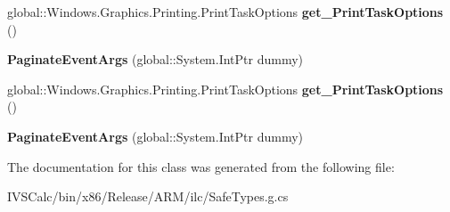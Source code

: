 \begin{DoxyCompactItemize}
global\+::\+Windows.\+Graphics.\+Printing.\+Print\+Task\+Options {\bfseries get\+\_\+\+Print\+Task\+Options} ()
\item 
\mbox{\label{class_windows_1_1_u_i_1_1_xaml_1_1_printing_1_1_paginate_event_args_a4d0a13d45708e56c2c85c10c133ea58c}} 
{\bfseries Paginate\+Event\+Args} (global\+::\+System.\+Int\+Ptr dummy)
\item 
\mbox{\label{class_windows_1_1_u_i_1_1_xaml_1_1_printing_1_1_paginate_event_args_abb34ebf478b806ec23eb3fba9d28cb13}} 
global\+::\+Windows.\+Graphics.\+Printing.\+Print\+Task\+Options {\bfseries get\+\_\+\+Print\+Task\+Options} ()
\item 
\mbox{\label{class_windows_1_1_u_i_1_1_xaml_1_1_printing_1_1_paginate_event_args_a4d0a13d45708e56c2c85c10c133ea58c}} 
{\bfseries Paginate\+Event\+Args} (global\+::\+System.\+Int\+Ptr dummy)
\end{DoxyCompactItemize}


The documentation for this class was generated from the following file\+:\begin{DoxyCompactItemize}
\item 
I\+V\+S\+Calc/bin/x86/\+Release/\+A\+R\+M/ilc/Safe\+Types.\+g.\+cs\end{DoxyCompactItemize}
